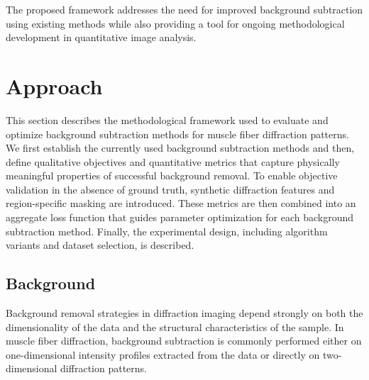 \documentclass[iucr]{iucrjournals}
\begin{document}
The proposed framework addresses the need for improved background subtraction using existing methods while also providing a tool for ongoing methodological development in quantitative image analysis.



\section{Approach}

This section describes the methodological framework used to evaluate and optimize background subtraction methods for muscle fiber diffraction patterns. We first establish the currently used background subtraction methods and then, define qualitative objectives and quantitative metrics that capture physically meaningful properties of successful background removal. To enable objective validation in the absence of ground truth, synthetic diffraction features and region-specific masking are introduced. These metrics are then combined into an aggregate loss function that guides parameter optimization for each background subtraction method. Finally, the experimental design, including algorithm variants and dataset selection, is described.

\subsection{Background}

Background removal strategies in diffraction imaging depend strongly on both the dimensionality of the data and the structural characteristics of the sample. In muscle fiber diffraction, background subtraction is commonly performed either on one-dimensional intensity profiles extracted from the data or directly on two-dimensional diffraction patterns.
\end{document}
